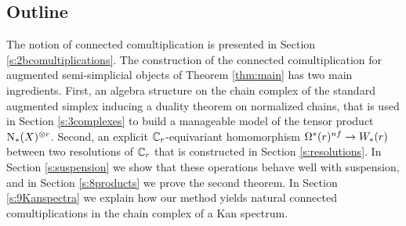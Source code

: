 \subsection*{Outline}

The notion of connected comultiplication is presented in Section \ref{s:2bcomultiplications}. The construction of the connected comultiplication for augmented semi-simplicial objects of Theorem \ref{thm:main} has two main ingredients. First, an algebra structure on the chain complex of the standard augmented simplex inducing a duality theorem on normalized chains, that is used in Section \ref{s:3complexes} to build a manageable model of the tensor product $\operatorname{N}_*(X)^{\otimes r}$. Second, an explicit $\mathbb{C}_r$-equivariant homomorphism $\Omega^*(r)^{nf}\to W_*(r)$ between two resolutions of $\mathbb{C}_r$ that is constructed in Section \ref{s:resolutions}. In Section \ref{s:suspension} we show that these operations behave well with suspension, and in Section \ref{s:8products} we prove the second theorem. In Section \ref{s:9Kanspectra} we explain how our method yields natural connected comultiplications in the chain complex of a Kan spectrum.




